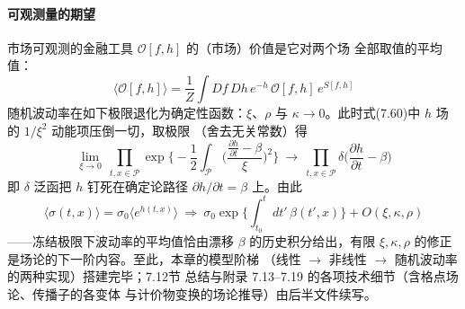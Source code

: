 \paragraph{可观测量的期望}
市场可观测的金融工具 $\mathcal{O}[f,h]$ 的（市场）价值是它对两个场
全部取值的平均值：
\begin{equation*}
\langle\mathcal{O}[f,h]\rangle=\frac{1}{Z}\int Df\,Dh\,e^{-h}\,
\mathcal{O}[f,h]\,e^{S[f,h]}
\tag{7.64}
\end{equation*}
随机波动率在如下极限退化为确定性函数：$\xi$、$\rho$ 与 $\kappa
\to0$。此时式(7.60)中 $h$ 场的 $1/\xi^{2}$ 动能项压倒一切，取极限
（舍去无关常数）得
\begin{equation*}
\lim_{\xi\to0}\ \prod_{t,x\in\mathcal{P}}\exp\biggl\{-\frac{1}{2}
\int_{\mathcal{P}}\biggl(\frac{\frac{\partial h}{\partial t}
-\beta}{\xi}\biggr)^{2}\biggr\}
\ \longrightarrow\ \prod_{t,x\in\mathcal{P}}
\delta\biggl(\frac{\partial h}{\partial t}-\beta\biggr)
\end{equation*}
即 $\delta$ 泛函把 $h$ 钉死在确定论路径 $\partial h/\partial t
=\beta$ 上。由此
\begin{equation*}
\langle\sigma(t,x)\rangle=\sigma_0\langle e^{h(t,x)}\rangle
\ \Rightarrow\ \sigma_0\exp\biggl\{\int_{t_0}^{t}dt'\,
\beta(t',x)\biggr\}+O(\xi,\kappa,\rho)
\end{equation*}
——冻结极限下波动率的平均值恰由漂移 $\beta$ 的历史积分给出，有限
$\xi,\kappa,\rho$ 的修正是场论的下一阶内容。至此，本章的模型阶梯
（线性 $\to$ 非线性 $\to$ 随机波动率的两种实现）搭建完毕；7.12节
总结与附录 7.13--7.19 的各项技术细节（含格点场论、传播子的各变体
与计价物变换的场论推导）由后半文件续写。



